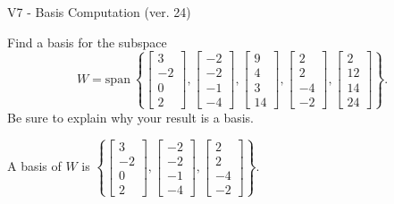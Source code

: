 \begin{exercise}
  \begin{exerciseTitle}V7 - Basis Computation (ver. 24)\end{exerciseTitle}
  \begin{exerciseStatement}
    Find a basis for the subspace 
\[W=\mathrm{span}\ \left\{\left[\begin{array}{r}
3 \\
-2 \\
0 \\
2
\end{array}\right] , \left[\begin{array}{r}
-2 \\
-2 \\
-1 \\
-4
\end{array}\right] , \left[\begin{array}{r}
9 \\
4 \\
3 \\
14
\end{array}\right] , \left[\begin{array}{r}
2 \\
2 \\
-4 \\
-2
\end{array}\right] , \left[\begin{array}{r}
2 \\
12 \\
14 \\
24
\end{array}\right]\right\}.\]
 Be sure to explain why your result is a basis.


  \end{exerciseStatement}
  \begin{exerciseAnswer}
   A basis of \(W\) is  \(\left\{\left[\begin{array}{r}
3 \\
-2 \\
0 \\
2
\end{array}\right] , \left[\begin{array}{r}
-2 \\
-2 \\
-1 \\
-4
\end{array}\right] , \left[\begin{array}{r}
2 \\
2 \\
-4 \\
-2
\end{array}\right]\right\}\).
  


  \end{exerciseAnswer}
\end{exercise}